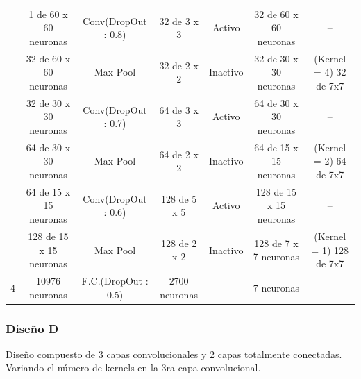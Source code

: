 \begin{itemize}
\begin{table}[H]
\begin{center}
\begin{tabular}{|>{\scriptsize}c|>{\scriptsize}c>{\scriptsize}c>{\scriptsize}c>{\scriptsize}c>{\scriptsize}c|>{\scriptsize}c|}
				 & 1 de 60 x 60 neuronas & Conv(DropOut : 0.8) & 32 de 3 x 3 & Activo & 32 de 60 x 60 neuronas & --\\ 
				\multirow{-2}{*}{1} &  32 de 60 x 60 neuronas &  Max Pool &  32 de 2 x 2 &  Inactivo & 32 de 30 x 30 neuronas & {\cellcolor[HTML]{DAE8FC}(Kernel = 4) 32 de 7x7}\\ \hline
				 & 32 de 30 x 30 neuronas & Conv(DropOut : 0.7) & {\cellcolor[HTML]{ffb3b3} 64 de 3 x 3} & Activo & 64 de 30 x 30 neuronas & --\\ 
				\multirow{-2}{*}{2} &  64 de 30 x 30 neuronas &  Max Pool &  64 de 2 x 2 &  Inactivo & 64 de 15 x 15 neuronas & {\cellcolor[HTML]{DAE8FC}(Kernel = 2) 64 de 7x7}\\ \hline			
				 & 64 de 15 x 15 neuronas & Conv(DropOut : 0.6) & 128 de 5 x 5 & Activo & 128 de 15 x 15 neuronas & --\\ 			
				\multirow{-2}{*}{3} &  128 de 15 x 15 neuronas &  Max Pool &  128 de 2 x 2 &  Inactivo & 128 de 7 x 7 neuronas & {\cellcolor[HTML]{DAE8FC} (Kernel = 1) 128 de 7x7 }\\ \hline
				4 &  {\cellcolor[HTML]{DAE8FC}10976 neuronas} &  F.C.(DropOut : 0.5) &  2700 neuronas &  -- & 7 neuronas & --\\ \hline
				\end{tabular}
				\end{center}
				\end{table}

			\end{itemize}

		\subsubsection{Diseño D} %
			
			Diseño compuesto de 3 capas convolucionales y 2 capas totalmente conectadas. Variando el número de kernels en la 3ra capa convolucional.

